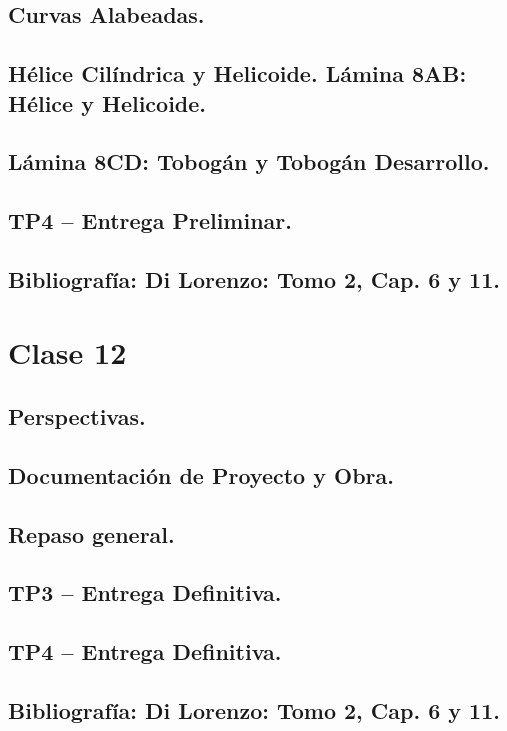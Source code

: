 \documentclass[12pt]{book}
\begin{document}
\section{Curvas Alabeadas.}
\section{Hélice Cilíndrica y Helicoide. Lámina 8AB: Hélice y Helicoide.}
\section{Lámina 8CD: Tobogán y Tobogán Desarrollo.}
\section{TP4 – Entrega Preliminar.}
\section{Bibliografía: Di Lorenzo: Tomo 2, Cap. 6 y 11.}

\chapter{Clase 12}
\section{Perspectivas.}
\section{Documentación de Proyecto y Obra.}
\section{Repaso general.}
\section{TP3 – Entrega Definitiva.}
\section{TP4 – Entrega Definitiva.}
\section{Bibliografía: Di Lorenzo: Tomo 2, Cap. 6 y 11.}
\end{document}

